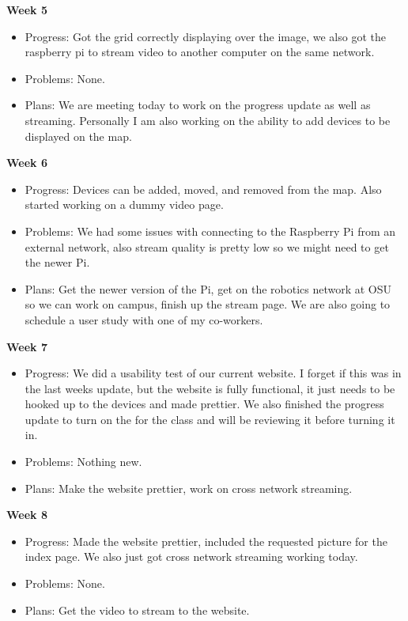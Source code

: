         \textbf{Week 5}
        \begin{itemize}
            \item Progress: Got the grid correctly displaying over the image, we also got the raspberry pi to stream video to another computer on the same network.

            \item Problems: None.

            \item Plans: We are meeting today to work on the progress update as well as streaming. Personally I am also working on the ability to add devices to be displayed on the map.
        \end{itemize}
        \textbf{Week 6}
        \begin{itemize}
            \item Progress: Devices can be added, moved, and removed from the map. Also started working on a dummy video page.

            \item Problems: We had some issues with connecting to the Raspberry Pi from an external network, also stream quality is pretty low so we might need to get the newer Pi.

            \item Plans: Get the newer version of the Pi, get on the robotics network at OSU so we can work on campus, finish up the stream page. We are also going to schedule a user study with one of my co-workers.
        \end{itemize}
        \textbf{Week 7}
        \begin{itemize}
            \item Progress: We did a usability test of our current website. I forget if this was in the last weeks update, but the website is fully functional, it just needs to be hooked up to the devices and made prettier. We also finished the progress update to turn on the for the class and will be reviewing it before turning it in.

            \item Problems: Nothing new.

            \item Plans: Make the website prettier, work on cross network streaming.
        \end{itemize}
        \textbf{Week 8}
        \begin{itemize}
            \item Progress: Made the website prettier, included the requested picture for the index page. We also just got cross network streaming working today.
            \item Problems: None.
            \item Plans: Get the video to stream to the website.
        \end{itemize}

